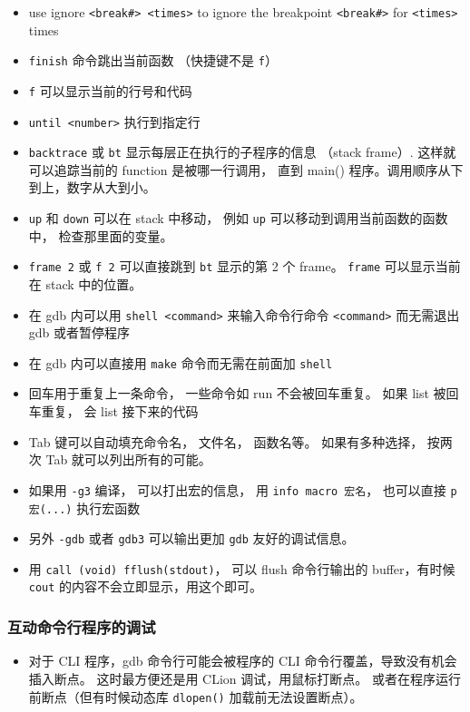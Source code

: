 \begin{itemize}
\item use ignore \verb`<break#> <times>` to ignore the breakpoint \verb`<break#>` for \verb`<times>` times
\item \verb`finish` 命令跳出当前函数 （快捷键不是 \verb`f`）
\item \verb`f` 可以显示当前的行号和代码
\item \verb`until <number>` 执行到指定行
\item \verb`backtrace` 或 \verb`bt` 显示每层正在执行的子程序的信息 （stack frame）. 这样就可以追踪当前的 function 是被哪一行调用， 直到 main() 程序。调用顺序从下到上，数字从大到小。
\item \verb`up` 和 \verb`down` 可以在 stack 中移动， 例如 \verb`up` 可以移动到调用当前函数的函数中， 检查那里面的变量。
\item \verb`frame 2` 或 \verb`f 2` 可以直接跳到 \verb`bt` 显示的第 2 个 frame。 \verb`frame` 可以显示当前在 stack 中的位置。
\item 在 gdb 内可以用 \verb`shell <command>` 来输入命令行命令 \verb`<command>` 而无需退出 gdb 或者暂停程序
\item 在 gdb 内可以直接用 \verb`make` 命令而无需在前面加 \verb`shell`
\item 回车用于重复上一条命令， 一些命令如 run 不会被回车重复。 如果 list 被回车重复， 会 list 接下来的代码
\item Tab 键可以自动填充命令名， 文件名， 函数名等。 如果有多种选择， 按两次 Tab 就可以列出所有的可能。
\item 如果用 \verb`-g3` 编译， 可以打出宏的信息， 用 \verb`info macro 宏名`， 也可以直接 \verb`p 宏(...)` 执行宏函数
\item 另外 \verb`-gdb` 或者 \verb`gdb3` 可以输出更加 \verb`gdb` 友好的调试信息。
\item 用 \verb`call (void) fflush(stdout)`， 可以 flush 命令行输出的 buffer，有时候 \verb`cout` 的内容不会立即显示，用这个即可。
\end{itemize}

\subsubsection{互动命令行程序的调试}
\begin{itemize}
\item 对于 CLI 程序，gdb 命令行可能会被程序的 CLI 命令行覆盖，导致没有机会插入断点。 这时最方便还是用 CLion 调试，用鼠标打断点。 或者在程序运行前断点（但有时候动态库 \verb`dlopen()` 加载前无法设置断点）。
\end{itemize}


